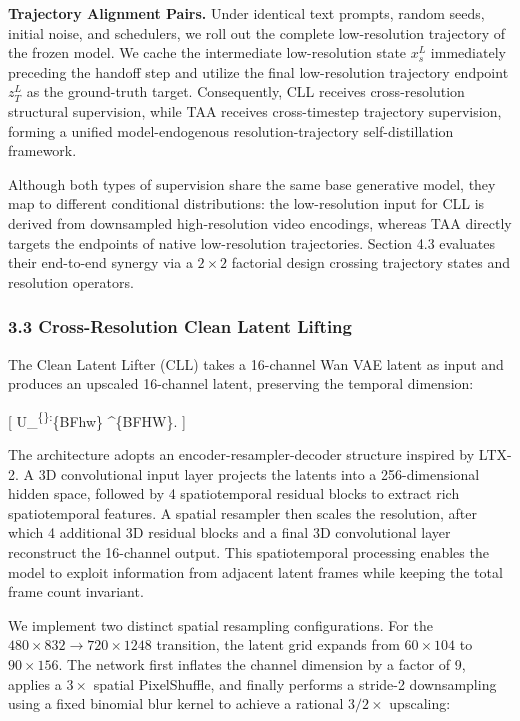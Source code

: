 \textbf{Trajectory Alignment Pairs.} Under identical text prompts, random seeds, initial noise, and schedulers, we roll out the complete low-resolution trajectory of the frozen model. We cache the intermediate low-resolution state \(x_s^L\) immediately preceding the handoff step and utilize the final low-resolution trajectory endpoint \(z_T^L\) as the ground-truth target. Consequently, CLL receives cross-resolution structural supervision, while TAA receives cross-timestep trajectory supervision, forming a unified model-endogenous resolution-trajectory self-distillation framework.

Although both types of supervision share the same base generative model, they map to different conditional distributions: the low-resolution input for CLL is derived from downsampled high-resolution video encodings, whereas TAA directly targets the endpoints of native low-resolution trajectories. Section 4.3 evaluates their end-to-end synergy via a \(2\times2\) factorial design crossing trajectory states and resolution operators.

\hypertarget{cross-resolution-clean-latent-lifting}{%
\subsubsection{3.3 Cross-Resolution Clean Latent Lifting}\label{cross-resolution-clean-latent-lifting}}

The Clean Latent Lifter (CLL) takes a 16-channel Wan VAE latent as input and produces an upscaled 16-channel latent, preserving the temporal dimension:

{[} U\_\psi\textsuperscript{\{\}:}\{B\times F\times h\times w\} \rightarrow {}\^{}\{B\times F\times H\times W\}. {]}

The architecture adopts an encoder-resampler-decoder structure inspired by LTX-2. A 3D convolutional input layer projects the latents into a 256-dimensional hidden space, followed by 4 spatiotemporal residual blocks to extract rich spatiotemporal features. A spatial resampler then scales the resolution, after which 4 additional 3D residual blocks and a final 3D convolutional layer reconstruct the 16-channel output. This spatiotemporal processing enables the model to exploit information from adjacent latent frames while keeping the total frame count invariant.

We implement two distinct spatial resampling configurations. For the \(480\times832 \rightarrow 720\times1248\) transition, the latent grid expands from \(60\times104\) to \(90\times156\). The network first inflates the channel dimension by a factor of 9, applies a \(3\times\) spatial PixelShuffle, and finally performs a stride-2 downsampling using a fixed binomial blur kernel to achieve a rational \(3/2\times\) upscaling:

